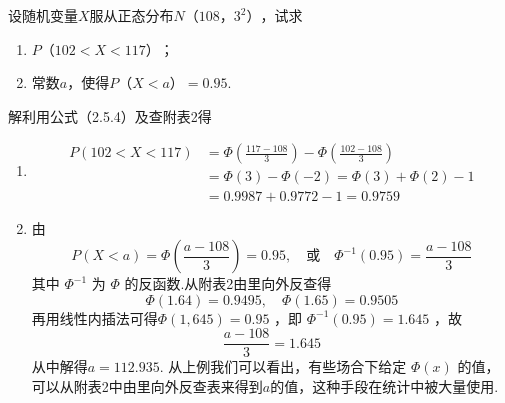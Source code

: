 \begin{example}
	设随机变量$ X $服从正态分布$ N（108，3^{2}） $，试求
	\begin{enumerate}
		\item $ P（102<X<117） $；
		\item 常数$ a $，使得$ P（X<a）=0.95 $.
	\end{enumerate}
	
	解利用公式（2.5.4）及查附表2得
	\begin{enumerate}
		\item \[
		\begin{aligned} P(102<X<117) &=\Phi\left(\frac{117-108}{3}\right)-\Phi\left(\frac{102-108}{3}\right) \\ &=\Phi(3)-\Phi(-2)=\Phi(3)+\Phi(2)-1 \\ &=0.9987+0.9772-1=0.9759 \end{aligned}
		\]
		\item 由
		\[
		P(X<a)=\Phi\left(\frac{a-108}{3}\right)=0.95, \quad \text{或} \quad \Phi^{-1}(0.95)=\frac{a-108}{3}
		\]
		其中 $\Phi^{-1}$ 为 $\Phi$ 的反函数.从附表2由里向外反查得
		\[
		\Phi(1.64)=0.9495, \quad \Phi(1.65)=0.9505
		\]
		再用线性内插法可得$\Phi(1,645)=0.95$ ，即 $\Phi^{-1}(0.95)=1.645$ ，故
		\[
		\frac{a-108}{3}=1.645
		\]
		从中解得$ a=112.935 $.
		从上例我们可以看出，有些场合下给定 $\Phi(x)$ 的值，可以从附表2中由里向外反查表来得到$ a $的值，这种手段在统计中被大量使用.
	\end{enumerate}
\end{example}

